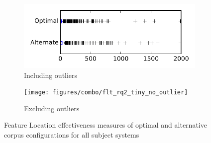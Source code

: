 
\begin{figure}
    \centering
    \begin{subfigure}{.4\textwidth}
        \centering
        \includegraphics[height=0.4\textheight]{figures/combo/flt_rq2_tiny}
        \caption{Including outliers}\label{fig:combo:flt:rq2:tiny_outlier}
    \end{subfigure}%
    \begin{subfigure}{.4\textwidth}
        \centering
        \texttt{[image: figures/combo/flt\_rq2\_tiny\_no\_outlier]}
        \caption{Excluding outliers}\label{fig:combo:flt:rq2:tiny_no_outlier}
    \end{subfigure}
\caption{Feature Location effectiveness measures of optimal and alternative corpus configurations for all subject systems}
\label{fig:combo:flt:rq2:tiny}
\end{figure}
